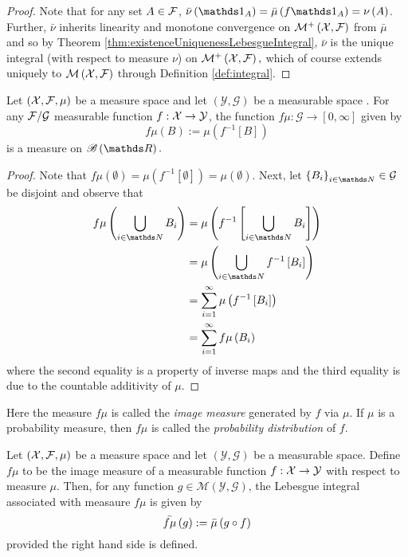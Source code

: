 \begin{proof}
Note that for any set $A\in\mathcal{F}$, $\lebInt{\nu}{\indicate_{A}}=\lebInt{\mu}{f\indicate_{A}}=\nu\left(A\right)$.
Further, $\bar{\nu}$ inherits linearity and monotone convergence
on $\mathcal{M}^{+}\left(\mathcal{X},\mathcal{F}\right)$ from $\bar{\mu}$ and so by Theorem
\ref{thm:existenceUniquenessLebesgueIntegral}, $\bar{\nu}$ is the
unique integral (with respect to measure $\nu$) on $\mathcal{M}^{+}\left(\mathcal{X},\mathcal{F}\right),$
which of course extends uniquely to $\mathcal{M}\left(\mathcal{X},\mathcal{F}\right)$ through
Definition \ref{def:integral}.
\end{proof}
\begin{prop}
\label{prop:imageMeasures}Let $\left(\mathcal{X},\mathcal{F},\mu\right)$ be a measure
space and let $\left(\mathcal{Y},\mathcal{G}\right)$ be a measurable
space . For any $\mathcal{F}/\mathcal{G}$ measurable function $f:\mathcal{X}\to\mathcal{Y}$,
the function $f\mu:\mathcal{G}\longrightarrow\left[0,\infty\right]$
given by 
\[
f\mu\left(B\right):=\mu\left(f^{-1}\left[B\right]\right)
\]
is a measure on $\borel\left(\R\right).$
\end{prop}

\begin{proof}
Note that $f\mu\left(\emptyset\right)=\mu\left(f^{-1}\left[\emptyset\right]\right)=\mu\left(\emptyset\right).$
Next, let $\left\{ B_{i}\right\} _{i\in\N}\in\mathcal{G}$ be disjoint
and observe that
\begin{align*}
f\mu\left(\bigcup_{i\in\N}B_{i}\right) & =\mu\left(f^{-1}\left[\bigcup_{i\in\N}B_{i}\right]\right)\\
 & =\mu\left(\bigcup_{i\in\N}f^{-1}\left[B_{i}\right]\right)\\
 & =\sum_{i=1}^{\infty}\mu\left(f^{-1}\left[B_{i}\right]\right)\\
 & =\sum_{i=1}^{\infty}f\mu\left(B_{i}\right)
\end{align*}
where the second equality is a property of inverse maps and the third
equality is due to the countable additivity of $\mu$.
\end{proof}
\begin{rem*}
Here the measure $f\mu$ is called the \emph{image measure }generated
by $f$ via $\mu.$ If $\mu$ is a probability measure, then $f\mu$
is called the \emph{probability distribution }of $f$.
\end{rem*}
\begin{cor}
\label{cor:changeOfVariables}Let $\left(\mathcal{X},\mathcal{F},\mu\right)$ be a measure
space and let $\left(\mathcal{Y},\mathcal{G}\right)$ be a measurable
space. Define $f\mu$ to be the image measure of a measurable function
$f:\mathcal{X}\to\mathcal{Y}$ with respect to measure $\mu.$ Then, for any
function $g\in\mathcal{M}\left(\mathcal{Y},\mathcal{G}\right)$, the
Lebesgue integral associated with measaure $f\mu$ is given by 
\[
\bar{f\mu}\left(g\right):=\bar{\mu}\left(g\circ f\right)
\]
provided the right hand side is defined.
\end{cor}

